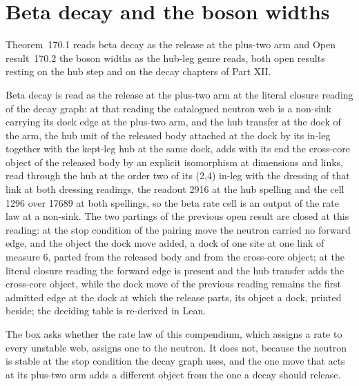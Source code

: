 \section{Beta decay and the boson widths}\label{mod:VI-8-beta-decay-and-the-boson-widths}
\label{narr:open:6-8}Theorem~170.1 reads beta decay as the release at the plus-two arm and Open result~170.2 the boson widths as the hub-leg genre reads, both open results resting on the hub step and on the decay chapters of Part XII.
\begin{chtheorem}\label{box:VI-8-beta-decay-and-the-boson-widths:1}
Beta decay is read as the release at the plus-two arm at the literal closure reading of the decay graph: at that reading the catalogued neutron web is a non-sink carrying its dock edge at the plus-two arm, and the hub transfer at the dock of the arm, the hub unit of the released body attached at the dock by its in-leg together with the kept-leg hub at the same dock, adds with its end the cross-core object of the released body by an explicit isomorphism at dimensions and links, read through the hub at the order two of its (2,4) in-leg with the dressing of that link at both dressing readings, the readout 2916 at the hub spelling and the cell 1296 over 17689 at both spellings, so the beta rate cell is an output of the rate law at a non-sink. The two partings of the previous open result are closed at this reading: at the stop condition of the pairing move the neutron carried no forward edge, and the object the dock move added, a dock of one site at one link of measure 6, parted from the released body and from the cross-core object; at the literal closure reading the forward edge is present and the hub transfer adds the cross-core object, while the dock move of the previous reading remains the first admitted edge at the dock at which the release parts, its object a dock, printed beside; the deciding table is re-derived in Lean.
\end{chtheorem}
The box asks whether the rate law of this compendium, which assigns a rate to every unstable web, assigns one to the neutron. It does not, because the neutron is stable at the stop condition the decay graph uses, and the one move that acts at its plus-two arm adds a different object from the one a decay should release.
